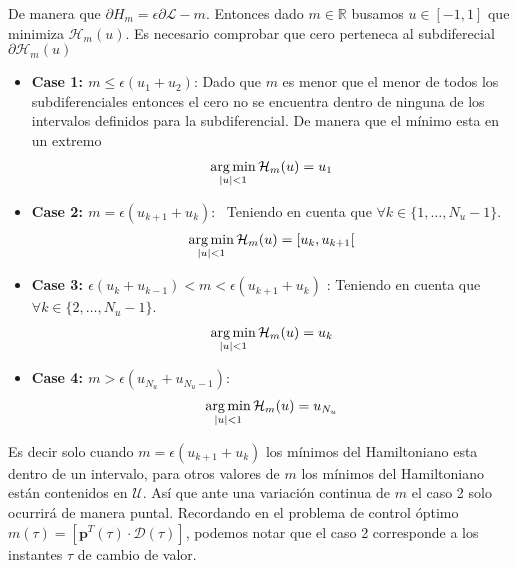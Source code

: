 De manera que $\partial H_m = \epsilon\partial \mathcal{L} - m$.
Entonces dado $m\in \mathbb{R}$ busamos $u \in [-1,1]$ que minimiza $\mathcal{H}_m(u)$. Es necesario comprobar que cero perteneca al subdiferecial $\partial \mathcal{H}_m(u)$

\begin{itemize}
    \item \textbf{Case 1: $m \leq \epsilon(u_1+u_2)$}: Dado que $m$ es menor que el menor de todos los subdiferenciales entonces el cero no se encuentra dentro de ninguna de los intervalos definidos para la subdiferencial. De manera que el mínimo esta en un extremo
    \begin{gather}
        \operatorname*{arg\,min}_{|u| < 1} \mathcal{H}_m(u) = u_1
    \end{gather} 
    \item \textbf{Case 2: $m = \epsilon(u_{k+1}+u_k) $}:  Teniendo en cuenta que $\forall k \in \{1,\dots,N_u-1\}$.
    \begin{gather}
        \operatorname*{arg\,min}_{|u| < 1} \mathcal{H}_m(u) = [u_k,u_{k+1}[ 
    \end{gather} 
    \item \textbf{Case 3: $\epsilon(u_k+u_{k-1})<m<\epsilon(u_{k+1}+u_k)$} : Teniendo en cuenta que $\forall k \in \{2,\dots,N_u-1\}$.
    \begin{gather}
        \operatorname*{arg\,min}_{|u| < 1} \mathcal{H}_m(u) = u_k
    \end{gather}
    \item \textbf{Case 4: $m>\epsilon(u_{N_u}+u_{N_u-1})$}:
    \begin{gather}
        \operatorname*{arg\,min}_{|u| < 1} \mathcal{H}_m(u) = u_{N_u}
    \end{gather} 
\end{itemize}

Es decir solo cuando  $m = \epsilon(u_{k+1}+u_k)$ los mínimos del Hamiltoniano esta dentro de un intervalo, para otros valores de $m$ los mínimos del Hamiltoniano están contenidos en $\mathcal{U}$. Así que ante una variación continua de $m$ el caso 2 solo ocurrirá de manera puntal. Recordando en el problema de control óptimo $m(\tau) = [\bm{p}^T(\tau) \cdot \bm{\mathcal{D}}(\tau)]$, podemos notar que el caso 2 corresponde a los instantes $\tau$ de cambio de valor.
